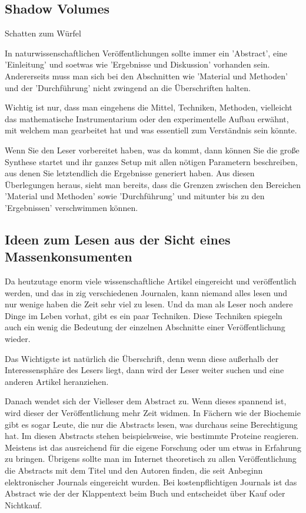 \documentclass[10pt,twocolumn]{scrartcl}
\begin{document}
\subsection{Shadow Volumes}

Schatten zum Würfel

In naturwissenschaftlichen Veröffentlichungen sollte immer 
ein 'Abstract', eine 'Einleitung' und soetwas wie 'Ergebnisse und
Diskussion' vorhanden sein. Andererseits muss man sich bei den
Abschnitten wie 'Material und Methoden' und der 'Durchführung'
nicht zwingend an die Überschriften halten. 

Wichtig ist nur, dass man eingehens die Mittel, Techniken,
Methoden, vielleicht das mathematische Instrumentarium 
oder den experimentelle Aufbau erwähnt, mit welchem man 
gearbeitet hat und was essentiell zum Verständnis sein könnte.

Wenn Sie den Leser vorbereitet haben, was da kommt, dann können
Sie die große Synthese startet und ihr ganzes Setup mit allen
nötigen Parametern beschreiben, aus denen Sie letztendlich
die Ergebnisse generiert haben. Aus diesen Überlegungen heraus, 
sieht man bereits, dass die Grenzen zwischen den Bereichen 
'Material und Methoden' sowie 'Durchführung' und mitunter 
bis zu den 'Ergebnissen' verschwimmen können.

\subsection*{Ideen zum Lesen aus der Sicht eines Massenkonsumenten}

Da heutzutage enorm viele wissenschaftliche Artikel
eingereicht und veröffentlich werden, und das in zig verschiedenen
Journalen, kann niemand alles lesen und nur wenige haben die Zeit 
sehr viel zu lesen. Und da man als Leser noch andere Dinge im Leben 
vorhat, gibt es ein paar Techniken.
Diese Techniken spiegeln auch ein wenig die Bedeutung der einzelnen 
Abschnitte einer Veröffentlichung wieder.

Das Wichtigste ist natürlich die Überschrift, denn wenn diese außerhalb
der Interessensphäre des Lesers liegt, dann wird der Leser weiter suchen
und eine anderen Artikel heranziehen.

Danach wendet sich der Vielleser dem Abstract zu. Wenn dieses spannend ist,
wird dieser der Veröffentlichung mehr Zeit widmen. In Fächern wie der
Biochemie gibt es sogar Leute, die nur die Abstracts lesen, was durchaus
seine Berechtigung hat. Im diesen Abstracts stehen beispielsweise, 
wie bestimmte Proteine reagieren. Meistens ist das ausreichend für 
die eigene Forschung oder um etwas in Erfahrung zu bringen.
Übrigens sollte man im Internet theoretisch zu allen Veröffentlichung
die Abstracts mit dem Titel und den Autoren finden, die seit Anbeginn 
elektronischer Journals eingereicht wurden. Bei kostenpflichtigen 
Journals ist das Abstract wie der der Klappentext beim Buch und
entscheidet über Kauf oder Nichtkauf.
\end{document}
